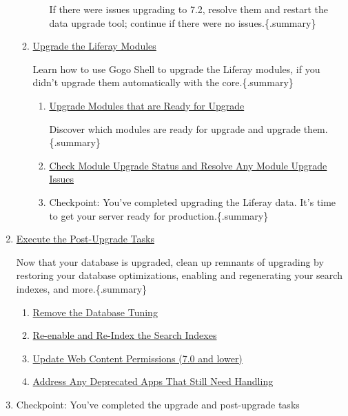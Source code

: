 \begin{enumerate}
\begin{enumerate}
\begin{enumerate}
      If there were issues upgrading to 7.2, resolve them and restart
      the data upgrade tool; continue if there were no
      issues.\{.summary\}
    \end{enumerate}
  \item
    \href{/docs/7-2/deploy/-/knowledge_base/d/upgrading-modules-using-gogo-shell}{Upgrade
    the Liferay Modules}

    Learn how to use Gogo Shell to upgrade the Liferay modules, if you
    didn't upgrade them automatically with the core.\{.summary\}

    \begin{enumerate}
    \def\labelenumiii{\arabic{enumiii}.}
    \item
      \href{/docs/7-2/deploy/-/knowledge_base/d/upgrading-modules-using-gogo-shell\#command-usage}{Upgrade
      Modules that are Ready for Upgrade}

      Discover which modules are ready for upgrade and upgrade
      them.\{.summary\}
    \item
      \href{/docs/7-2/deploy/-/knowledge_base/d/upgrading-modules-using-gogo-shell\#checking-upgrade-status}{Check
      Module Upgrade Status and Resolve Any Module Upgrade Issues}
    \item
      Checkpoint: You've completed upgrading the Liferay data. It's time
      to get your server ready for production.\{.summary\}
    \end{enumerate}
  \end{enumerate}
\item
  \href{/docs/7-2/deploy/-/knowledge_base/d/executing-post-upgrade-tasks}{Execute
  the Post-Upgrade Tasks}

  Now that your database is upgraded, clean up remnants of upgrading by
  restoring your database optimizations, enabling and regenerating your
  search indexes, and more.\{.summary\}

  \begin{enumerate}
  \def\labelenumii{\arabic{enumii}.}
  \item
    \href{/docs/7-2/deploy/-/knowledge_base/d/executing-post-upgrade-tasks\#tuning-your-database-for-production}{Remove
    the Database Tuning}
  \item
    \href{/docs/7-2/deploy/-/knowledge_base/d/executing-post-upgrade-tasks\#re-enabling-search-indexing-and-re-indexing-search-indexes}{Re-enable
    and Re-Index the Search Indexes}
  \item
    \href{/docs/7-2/deploy/-/knowledge_base/d/executing-post-upgrade-tasks\#enabling-web-content-view-permissions}{Update
    Web Content Permissions (7.0 and lower)}
  \item
    \href{/docs/7-2/deploy/-/knowledge_base/d/planning-for-deprecated-applications}{Address
    Any Deprecated Apps That Still Need Handling}
  \end{enumerate}
\item
  Checkpoint: You've completed the upgrade and post-upgrade tasks
\end{enumerate}

